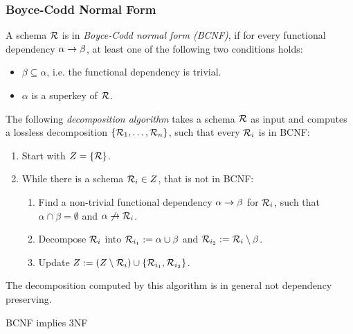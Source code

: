 

\subsubsection{Boyce-Codd Normal Form}
\label{bcnf}

A schema $\mathcal{R}$ is in \emph{Boyce-Codd normal form (BCNF)}, if for every functional dependency $\alpha \rightarrow \beta$, at least one of the following two conditions holds:
\begin{itemize}
\item $\beta \subseteq \alpha$, i.e. the functional dependency is trivial.
\item $\alpha$ is a superkey of $\mathcal{R}$.
\end{itemize}

The following \emph{decomposition algorithm} takes a schema $\mathcal{R}$ as input and computes a lossless decomposition $\{\mathcal{R}_1,\ldots,\mathcal{R}_n\}$, such that every $\mathcal{R}_i$ is in BCNF:

\begin{enumerate}
\item
	Start with $Z = \{ \mathcal{R} \}$.
\item
	While there is a schema $\mathcal{R}_i \in Z$, that is not in BCNF:
	\begin{enumerate}
	\item Find a non-trivial functional dependency $\alpha \rightarrow \beta$ for $\mathcal{R}_i$, such that $\alpha \cap \beta = \emptyset$ and $\alpha \not\rightarrow \mathcal{R}_i$.
	\item Decompose $\mathcal{R}_i$ into $\mathcal{R}_{i_1} := \alpha \cup \beta$ and $\mathcal{R}_{i_2} := \mathcal{R}_i \setminus \beta$.
	\item Update $Z := (Z \setminus \mathcal{R}_i) \cup \{ \mathcal{R}_{i_1}, \mathcal{R}_{i_2} \}$.
	\end{enumerate}
\end{enumerate}

\begin{note}
The decomposition computed by this algorithm is in general not dependency preserving.
\end{note}

\begin{note}
BCNF implies 3NF
\end{note}



